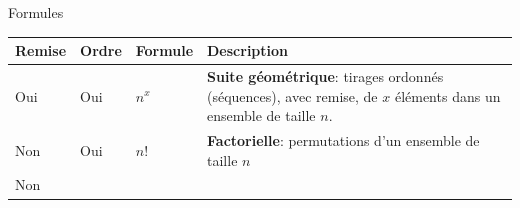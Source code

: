 \documentclass[ignorenonframetext,]{beamer}
\begin{document}
\begin{frame}{Formules}
\protect\hypertarget{formules}{}

\begin{longtable}[]{@{}llll@{}}
\toprule
\begin{minipage}[b]{0.12\columnwidth}\raggedright
Remise\strut
\end{minipage} & \begin{minipage}[b]{0.10\columnwidth}\raggedright
Ordre\strut
\end{minipage} & \begin{minipage}[b]{0.18\columnwidth}\raggedright
Formule\strut
\end{minipage} & \begin{minipage}[b]{0.49\columnwidth}\raggedright
Description\strut
\end{minipage}\tabularnewline
\midrule
\endhead
\begin{minipage}[t]{0.12\columnwidth}\raggedright
Oui\strut
\end{minipage} & \begin{minipage}[t]{0.10\columnwidth}\raggedright
Oui\strut
\end{minipage} & \begin{minipage}[t]{0.18\columnwidth}\raggedright
\(n^x\)\strut
\end{minipage} & \begin{minipage}[t]{0.49\columnwidth}\raggedright
\textbf{Suite géométrique}: tirages ordonnés (séquences), avec remise,
de \(x\) éléments dans un ensemble de taille \(n\).\strut
\end{minipage}\tabularnewline
\begin{minipage}[t]{0.12\columnwidth}\raggedright
Non\strut
\end{minipage} & \begin{minipage}[t]{0.10\columnwidth}\raggedright
Oui\strut
\end{minipage} & \begin{minipage}[t]{0.18\columnwidth}\raggedright
\(n!\)\strut
\end{minipage} & \begin{minipage}[t]{0.49\columnwidth}\raggedright
\textbf{Factorielle}: permutations d'un ensemble de taille \(n\)\strut
\end{minipage}\tabularnewline
\begin{minipage}[t]{0.12\columnwidth}\raggedright
Non\strut
\end{minipage} & \begin{minipage}[t]{0.10\columnwidth}\raggedright

\end{minipage}
\end{longtable}
\end{frame}
\end{document}
